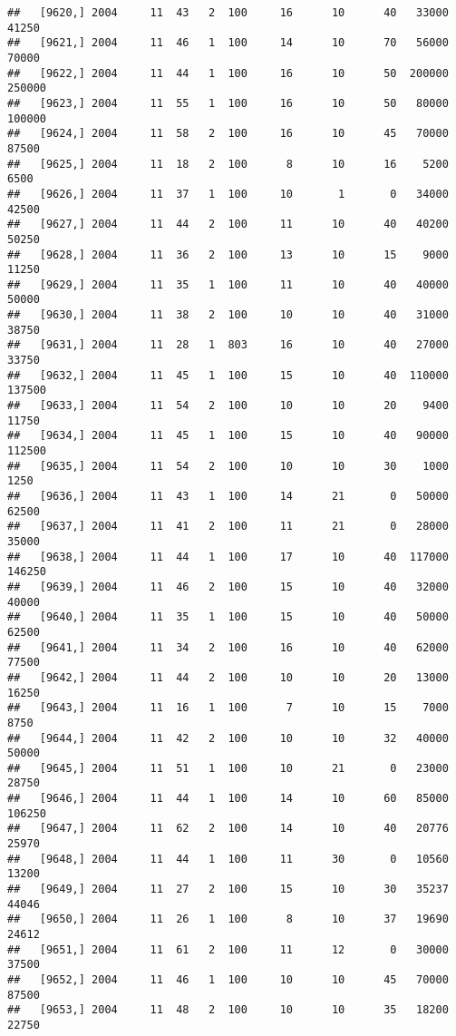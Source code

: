 \documentclass{article}\usepackage[]{graphicx}\usepackage[]{color}
\makeatletter
\newenvironment{kframe}{%
 \def\at@end@of@kframe{}%
 \ifinner\ifhmode%
  \def\at@end@of@kframe{\end{minipage}}%
  \begin{minipage}{\columnwidth}%
 \fi\fi%
 \def\FrameCommand##1{\hskip\@totalleftmargin \hskip-\fboxsep
 \colorbox{shadecolor}{##1}\hskip-\fboxsep
     \hskip-\linewidth \hskip-\@totalleftmargin \hskip\columnwidth}%
 \MakeFramed {\advance\hsize-\width
   \@totalleftmargin\z@ \linewidth\hsize
   \@setminipage}}%
 {\par\unskip\endMakeFramed%
 \at@end@of@kframe}
\newenvironment{knitrout}{}{} %
\makeatother
\begin{document}
\begin{knitrout}
\begin{kframe}
\begin{verbatim}
##   [9620,] 2004     11  43   2  100     16      10      40   33000   41250
##   [9621,] 2004     11  46   1  100     14      10      70   56000   70000
##   [9622,] 2004     11  44   1  100     16      10      50  200000  250000
##   [9623,] 2004     11  55   1  100     16      10      50   80000  100000
##   [9624,] 2004     11  58   2  100     16      10      45   70000   87500
##   [9625,] 2004     11  18   2  100      8      10      16    5200    6500
##   [9626,] 2004     11  37   1  100     10       1       0   34000   42500
##   [9627,] 2004     11  44   2  100     11      10      40   40200   50250
##   [9628,] 2004     11  36   2  100     13      10      15    9000   11250
##   [9629,] 2004     11  35   1  100     11      10      40   40000   50000
##   [9630,] 2004     11  38   2  100     10      10      40   31000   38750
##   [9631,] 2004     11  28   1  803     16      10      40   27000   33750
##   [9632,] 2004     11  45   1  100     15      10      40  110000  137500
##   [9633,] 2004     11  54   2  100     10      10      20    9400   11750
##   [9634,] 2004     11  45   1  100     15      10      40   90000  112500
##   [9635,] 2004     11  54   2  100     10      10      30    1000    1250
##   [9636,] 2004     11  43   1  100     14      21       0   50000   62500
##   [9637,] 2004     11  41   2  100     11      21       0   28000   35000
##   [9638,] 2004     11  44   1  100     17      10      40  117000  146250
##   [9639,] 2004     11  46   2  100     15      10      40   32000   40000
##   [9640,] 2004     11  35   1  100     15      10      40   50000   62500
##   [9641,] 2004     11  34   2  100     16      10      40   62000   77500
##   [9642,] 2004     11  44   2  100     10      10      20   13000   16250
##   [9643,] 2004     11  16   1  100      7      10      15    7000    8750
##   [9644,] 2004     11  42   2  100     10      10      32   40000   50000
##   [9645,] 2004     11  51   1  100     10      21       0   23000   28750
##   [9646,] 2004     11  44   1  100     14      10      60   85000  106250
##   [9647,] 2004     11  62   2  100     14      10      40   20776   25970
##   [9648,] 2004     11  44   1  100     11      30       0   10560   13200
##   [9649,] 2004     11  27   2  100     15      10      30   35237   44046
##   [9650,] 2004     11  26   1  100      8      10      37   19690   24612
##   [9651,] 2004     11  61   2  100     11      12       0   30000   37500
##   [9652,] 2004     11  46   1  100     10      10      45   70000   87500
##   [9653,] 2004     11  48   2  100     10      10      35   18200   22750

\end{verbatim}
\end{kframe}
\end{knitrout}
\end{document}

